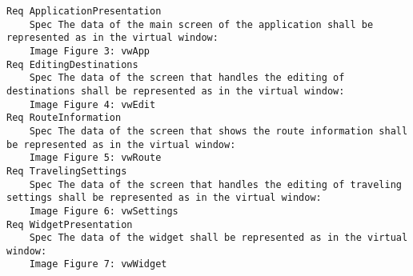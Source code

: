 

\begin{lstlisting}
Req ApplicationPresentation
	Spec The data of the main screen of the application shall be represented as in the virtual window:
	Image Figure 3: vwApp
Req EditingDestinations
	Spec The data of the screen that handles the editing of destinations shall be represented as in the virtual window:
	Image Figure 4: vwEdit
Req RouteInformation
	Spec The data of the screen that shows the route information shall be represented as in the virtual window:
	Image Figure 5: vwRoute
Req TravelingSettings
	Spec The data of the screen that handles the editing of traveling settings shall be represented as in the virtual window:
	Image Figure 6: vwSettings
Req WidgetPresentation
	Spec The data of the widget shall be represented as in the virtual window:
	Image Figure 7: vwWidget

\end{lstlisting}